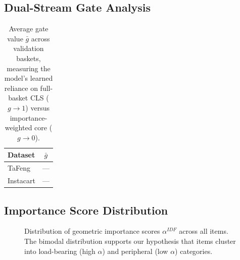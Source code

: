 \documentclass[conference]{IEEEtran}
\begin{document}


\subsection{Dual-Stream Gate Analysis}

\begin{table}[h]
\centering
\caption{Average gate value $\bar{g}$ across validation baskets, measuring the model's learned reliance on full-basket CLS ($g \to 1$) versus importance-weighted core ($g \to 0$).}
\label{tab:gate}
\begin{tabular}{lc}
\toprule
\textbf{Dataset} & $\bar{g}$ \\
\midrule
TaFeng    & --- \\
Instacart & --- \\
\bottomrule
\end{tabular}
\end{table}


\subsection{Importance Score Distribution}


\begin{figure}[h]
\centering
\caption{Distribution of geometric importance scores $\alpha^{IDF}$ across all items. The bimodal distribution supports our hypothesis that items cluster into load-bearing (high $\alpha$) and peripheral (low $\alpha$) categories.}
\label{fig:importance_dist}
\end{figure}
\end{document}
